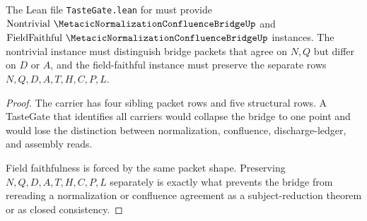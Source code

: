 \begin{theorem}
\label{thm:metacic-normalization-confluence-bridge-tastegate-surface}
The Lean file \texttt{TasteGate.lean} for \MetacicNormalizationConfluenceBridgeUp{} must provide $\mathrm{Nontrivial}\ \MetacicNormalizationConfluenceBridgeUp$ and $\mathrm{FieldFaithful}\ \MetacicNormalizationConfluenceBridgeUp$ instances. The nontrivial instance must distinguish bridge packets that agree on $N,Q$ but differ on $D$ or $A$, and the field-faithful instance must preserve the separate rows $N,Q,D,A,T,H,C,P,L$.
\end{theorem}
\begin{proof}
The carrier has four sibling packet rows and five structural rows. A TasteGate that identifies all carriers would collapse the bridge to one point and would lose the distinction between normalization, confluence, discharge-ledger, and assembly reads.

Field faithfulness is forced by the same packet shape. Preserving $N,Q,D,A,T,H,C,P,L$ separately is exactly what prevents the bridge from rereading a normalization or confluence agreement as a subject-reduction theorem or as closed consistency.
\end{proof}

